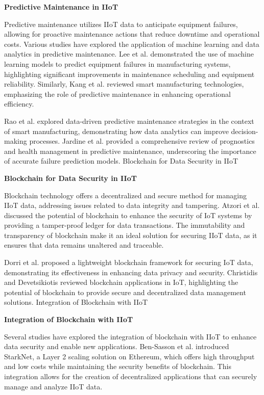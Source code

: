 \documentclass{article}
\begin{document}
\noindent\textbf{Predictive Maintenance in IIoT}

Predictive maintenance utilizes IIoT data to anticipate equipment failures, allowing for proactive maintenance actions that reduce downtime and operational costs. Various studies have explored the application of machine learning and data analytics in predictive maintenance. Lee et al. \cite{lee2018predictive} demonstrated the use of machine learning models to predict equipment failures in manufacturing systems, highlighting significant improvements in maintenance scheduling and equipment reliability. Similarly, Kang et al. \cite{kang2016smart} reviewed smart manufacturing technologies, emphasizing the role of predictive maintenance in enhancing operational efficiency.

Rao et al. \cite{rao2016predictive} explored data-driven predictive maintenance strategies in the context of smart manufacturing, demonstrating how data analytics can improve decision-making processes. Jardine et al. \cite{jardine2006review} provided a comprehensive review of prognostics and health management in predictive maintenance, underscoring the importance of accurate failure prediction models.
Blockchain for Data Security in IIoT

\noindent\textbf{Blockchain for Data Security in IIoT}

Blockchain technology offers a decentralized and secure method for managing IIoT data, addressing issues related to data integrity and tampering. Atzori et al. \cite{atzori2010internet} discussed the potential of blockchain to enhance the security of IoT systems by providing a tamper-proof ledger for data transactions. The immutability and transparency of blockchain make it an ideal solution for securing IIoT data, as it ensures that data remains unaltered and traceable.

Dorri et al. \cite{dorri2017blockchain} proposed a lightweight blockchain framework for securing IoT data, demonstrating its effectiveness in enhancing data privacy and security. Christidis and Devetsikiotis \cite{christidis2016blockchains} reviewed blockchain applications in IoT, highlighting the potential of blockchain to provide secure and decentralized data management solutions.
Integration of Blockchain with IIoT

\noindent\textbf{Integration of Blockchain with IIoT}

Several studies have explored the integration of blockchain with IIoT to enhance data security and enable new applications. Ben-Sasson et al. \cite{ben2019starknet} introduced StarkNet, a Layer 2 scaling solution on Ethereum, which offers high throughput and low costs while maintaining the security benefits of blockchain. This integration allows for the creation of decentralized applications that can securely manage and analyze IIoT data.
\end{document}
